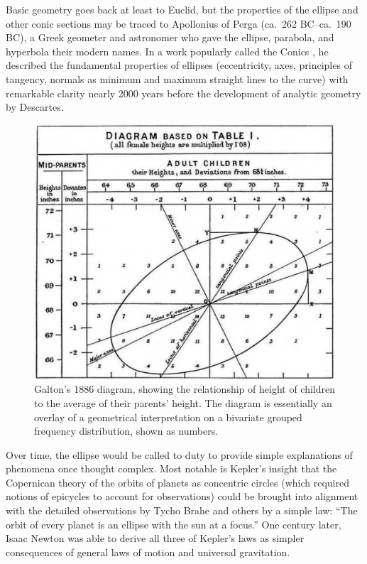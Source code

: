 Basic geometry goes back at least to Euclid, but the properties of the ellipse and  other
conic sections may be traced to Apollonius  of Perga (ca.~262 BC--ca.~190 BC),  a
Greek geometer and astronomer who gave the ellipse, parabola, and hyperbola their
modern names. In a work popularly called the Conics \citep{Boyer:91}, he  described
the  fundamental  properties  of  ellipses  (eccentricity,  axes,  principles of
tangency,  normals as  minimum and  maximum straight  lines to  the curve)  with
remarkable clarity nearly 2000 years before the development of analytic geometry
by Descartes.

\begin{figure}[htb]
  \centering
  \includegraphics[width=.75\textwidth]{fig/galton-corr}
  \caption{Galton's 1886 diagram, showing the relationship of height of children
to the average of their parents' height. The diagram is essentially an overlay
of a geometrical interpretation on a bivariate grouped frequency distribution, shown
as numbers.}%
  \label{fig:galton-corr}
\end{figure}

Over time, the ellipse would be called to duty to provide simple explanations of
phenomena  once thought  complex.  Most  notable is  Kepler's insight  that the
Copernican theory of the orbits of planets as concentric circles (which required
notions  of  epicycles  to  account  for  observations)  could  be  brought into
alignment with the detailed observations by  Tycho Brahe and others by a  simple
law: ``The orbit  of every planet  is an ellipse  with the sun  at a focus.''  One
century later, Isaac  Newton was able  to derive all  three of Kepler's  laws as
simpler consequences of general laws of motion and universal gravitation.


